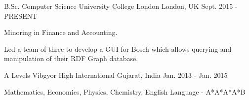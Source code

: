 

\begin{cventries}

  \cventry
    {B.Sc. Computer Science}
    {University College London}
    {London, UK}
    {Sept. 2015 - PRESENT}
    {
      \begin{cvitems}
        \item {Minoring in Finance and Accounting.}
        \item {Led a team of three to develop a GUI for Bosch which allows querying and manipulation of their RDF Graph database.}
      \end{cvitems}
    }

  \cventry
    {A Levels}
    {Vibgyor High International}
    {Gujarat, India}
    {Jan. 2013 - Jan. 2015}
    {
      \begin{cvitems}
        \item {Mathematics, Economics, Physics, Chemistry, English Language - A*A*A*A*B}
      \end{cvitems}
    }
\end{cventries}
